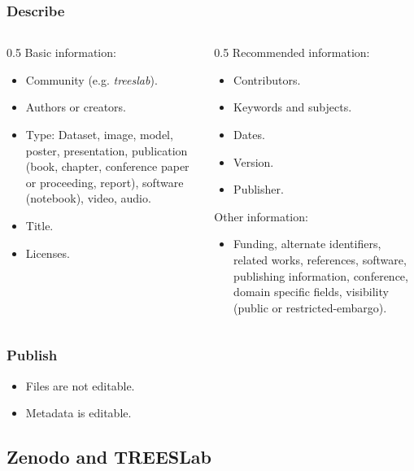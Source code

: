 \begin{frame}
  \frametitle{Describe}
  \begin{columns}
    \begin{column}{0.5\textwidth}
      Basic information:
      \begin{itemize}
        \item Community (e.g. \textit{treeslab}).
        \item Authors or creators.
        \item Type: Dataset, image, model, poster, presentation, publication
          (book, chapter, conference paper or proceeding, report), software
          (notebook), video, audio.
        \item Title.
        \item Licenses.
      \end{itemize}
    \end{column}
    \begin{column}{0.5\textwidth}
      Recommended information:
      \begin{itemize}
        \item Contributors.
        \item Keywords and subjects.
        \item Dates.
        \item Version.
        \item Publisher.
      \end{itemize}
      Other information:
      \begin{itemize}
        \item Funding, alternate identifiers, related works, references,
          software, publishing information, conference, domain specific fields,
          visibility (public or restricted-embargo).
      \end{itemize}
    \end{column}
  \end{columns}
\end{frame}

\begin{frame}
  \frametitle{Publish}
  \begin{itemize}
    \item Files are not editable.
    \item Metadata is editable.
  \end{itemize}
\end{frame}

\subsection{Zenodo and TREESLab}

